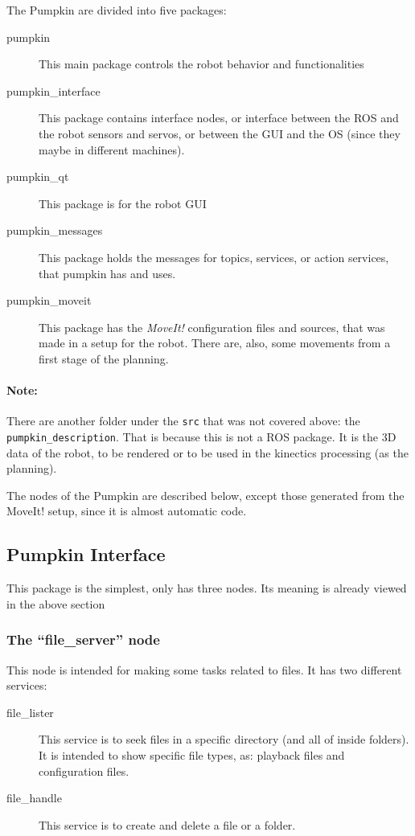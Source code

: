 \documentclass[oneside,a4paper,titlepage]{article}
\begin{document}
The Pumpkin are divided into five packages:

\begin{description}
	\item[pumpkin] This main package controls the robot behavior and functionalities
	\item[pumpkin\_interface] This package contains interface nodes, or interface between the ROS and the robot sensors and servos, or between the GUI and the OS (since they maybe in different machines).
	\item[pumpkin\_qt] This package is for the robot GUI
	\item[pumpkin\_messages] This package holds the messages for topics, services, or action services, that pumpkin has and uses.
	\item[pumpkin\_moveit] This package has the \emph{MoveIt!} configuration files and sources, that was made in a setup for the robot. There are, also, some movements from a first stage of the planning.
\end{description}

\paragraph{Note: } There are another folder under the \texttt{src} that was not covered above: the \texttt{pumpkin\_description}. That is because this is not a ROS package. It is the 3D data of the robot, to be rendered or to be used in the kinectics processing (as the planning).

The nodes of the Pumpkin are described below, except those generated from the MoveIt! setup, since it is almost automatic code.

\subsection{Pumpkin Interface}

This package is the simplest, only has three nodes. Its meaning is already viewed in the above section

\subsubsection{The ``file\_server'' node}

This node is intended for making some tasks related to files.
It has two different services:

\begin{description}
	\item[file\_lister] This service is to seek files in a specific directory (and all of inside folders). It is intended to show specific file types, as: playback files and configuration files.
	\item[file\_handle] This service is to create and delete a file or a folder.
\end{description}
\end{document}
